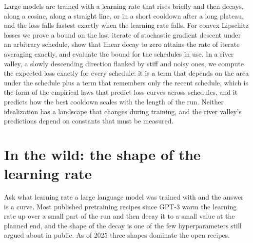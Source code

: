 \newcommand{\schedulesG}{\mathcal{G}}
\newcommand{\schedulesK}{\mathcal{K}}

\begin{refsection}

\begin{chaptersummary}
Large models are trained with a learning rate that rises briefly and then decays, along a cosine, along a straight line, or in a short cooldown after a long plateau, and the loss falls fastest exactly when the learning rate falls. For convex Lipschitz losses we prove a bound on the last iterate of stochastic gradient descent under an arbitrary schedule, show that linear decay to zero attains the rate of iterate averaging exactly, and evaluate the bound for the schedules in use. In a river valley, a slowly descending direction flanked by stiff and noisy ones, we compute the expected loss exactly for every schedule: it is a term that depends on the area under the schedule plus a term that remembers only the recent schedule, which is the form of the empirical laws that predict loss curves across schedules, and it predicts how the best cooldown scales with the length of the run. Neither idealization has a landscape that changes during training, and the river valley's predictions depend on constants that must be measured.
\end{chaptersummary}

\section{In the wild: the shape of the learning rate}\label{sec:schedules:wild}

Ask what learning rate a large language model was trained with and the answer is a curve. Most published pretraining recipes since GPT-3 warm the learning rate up over a small part of the run and then decay it to a small value at the planned end, and the shape of the decay is one of the few hyperparameters still argued about in public. As of 2025 three shapes dominate the open recipes.


\end{refsection}
